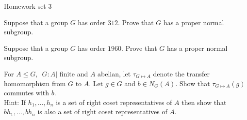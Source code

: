 \documentclass{article}
\begin{document}
\maketitle
Homework set 3

\pagebreak

\begin{homeworkProblem}
    Suppose that a group $G$ has order $312$. 
    Prove that $G$ has a proper normal subgroup.\\
    \solution
    

\end{homeworkProblem}

\pagebreak

\begin{homeworkProblem}
    Suppose that a group $G$ has order $1960$. Prove that $G$ has a proper normal subgroup.\\
    \solution


    
\end{homeworkProblem}

\pagebreak

\begin{homeworkProblem}
For $A \leq G, \ \lvert G:A \rvert$ finite and $A$ abelian,
let $\tau_{G \mapsto A}$ denote the transfer 
homomorphism from $G$ to $A$. Let $g \in G$
and $b \in N_G(A)$. Show that 
$\tau_{G \mapsto A} (g)$ commutes with $b$.\\
Hint: If $ h_1, \ldots, h_{n} $ is a set of right coset representatives 
of $A$ then show that $ bh_1, \ldots, bh_n $ is also a set of right
coset representatives of $A$.

    
\end{homeworkProblem}

\pagebreak
\end{document}
